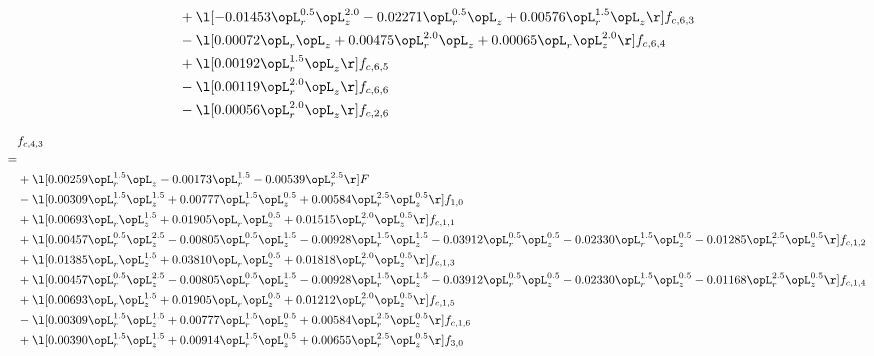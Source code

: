 \begin{alignat}{2}
& + \l[  -0.01453 \opL_r^{0.5} \opL_z^{2.0}   -0.02271 \opL_r^{0.5} \opL_z +  0.00576 \opL_r^{1.5} \opL_z  \r] f_{c,6,3} \nonumber \\ 
& - \l[  0.00072 \opL_r \opL_z +  0.00475 \opL_r^{2.0} \opL_z +  0.00065 \opL_r \opL_z^{2.0}  \r] f_{c,6,4} \nonumber \\ 
& + \l[  0.00192 \opL_r^{1.5} \opL_z  \r] f_{c,6,5} \nonumber \\ 
& - \l[  0.00119 \opL_r^{2.0} \opL_z  \r] f_{c,6,6} \nonumber \\ 
& - \l[  0.00056 \opL_r^{2.0} \opL_z  \r] f_{c,2,6} \nonumber \\ 
\end{alignat} 


\begin{alignat}{2} 
\label{eq:f_43_1} 
& f_{c,4,3} \nonumber \\ 
 = \\ 
& + \l[  0.00259 \opL_r^{1.5} \opL_z   -0.00173 \opL_r^{1.5}   -0.00539 \opL_r^{2.5}  \r] F \nonumber \\ 
& - \l[  0.00309 \opL_r^{1.5} \opL_z^{1.5} +  0.00777 \opL_r^{1.5} \opL_z^{0.5} +  0.00584 \opL_r^{2.5} \opL_z^{0.5}  \r] f_{1,0} \nonumber \\ 
& + \l[  0.00693 \opL_r \opL_z^{1.5} +  0.01905 \opL_r \opL_z^{0.5} +  0.01515 \opL_r^{2.0} \opL_z^{0.5}  \r] f_{c,1,1} \nonumber \\ 
& + \l[  0.00457 \opL_r^{0.5} \opL_z^{2.5}   -0.00805 \opL_r^{0.5} \opL_z^{1.5}   -0.00928 \opL_r^{1.5} \opL_z^{1.5}   -0.03912 \opL_r^{0.5} \opL_z^{0.5}   -0.02330 \opL_r^{1.5} \opL_z^{0.5}   -0.01285 \opL_r^{2.5} \opL_z^{0.5}  \r] f_{c,1,2} \nonumber \\ 
& + \l[  0.01385 \opL_r \opL_z^{1.5} +  0.03810 \opL_r \opL_z^{0.5} +  0.01818 \opL_r^{2.0} \opL_z^{0.5}  \r] f_{c,1,3} \nonumber \\ 
& + \l[  0.00457 \opL_r^{0.5} \opL_z^{2.5}   -0.00805 \opL_r^{0.5} \opL_z^{1.5}   -0.00928 \opL_r^{1.5} \opL_z^{1.5}   -0.03912 \opL_r^{0.5} \opL_z^{0.5}   -0.02330 \opL_r^{1.5} \opL_z^{0.5}   -0.01168 \opL_r^{2.5} \opL_z^{0.5}  \r] f_{c,1,4} \nonumber \\ 
& + \l[  0.00693 \opL_r \opL_z^{1.5} +  0.01905 \opL_r \opL_z^{0.5} +  0.01212 \opL_r^{2.0} \opL_z^{0.5}  \r] f_{c,1,5} \nonumber \\ 
& - \l[  0.00309 \opL_r^{1.5} \opL_z^{1.5} +  0.00777 \opL_r^{1.5} \opL_z^{0.5} +  0.00584 \opL_r^{2.5} \opL_z^{0.5}  \r] f_{c,1,6} \nonumber \\ 
& + \l[  0.00390 \opL_r^{1.5} \opL_z^{1.5} +  0.00914 \opL_r^{1.5} \opL_z^{0.5} +  0.00655 \opL_r^{2.5} \opL_z^{0.5}  \r] f_{3,0} \nonumber \\ 

\end{alignat}
